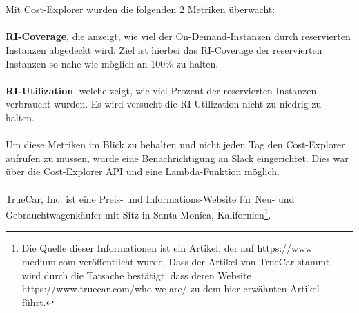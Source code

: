 \\\\
Mit Cost-Explorer wurden die folgenden 2  Metriken überwacht: 
\\\\
\textbf{RI-Coverage}, die anzeigt, wie viel der On-Demand-Instanzen durch reservierten Instanzen abgedeckt wird. Ziel ist hierbei das RI-Coverage der reservierten Instanzen so nahe wie möglich an 100\% zu halten.
\\\\
\textbf{RI-Utilization}, welche zeigt, wie viel Prozent der reservierten Instanzen verbraucht wurden. Es wird versucht die RI-Utilization nicht zu niedrig zu halten.
\\\\
Um diese Metriken im Blick zu behalten und nicht jeden Tag den Cost-Explorer aufrufen zu müssen, wurde eine Benachrichtigung an Slack eingerichtet. Dies war über die Cost-Explorer API und eine Lambda-Funktion möglich.
\\\\
TrueCar, Inc. ist eine Preis- und Informations-Website für Neu- und Gebrauchtwagenkäufer mit Sitz in Santa Monica, Kalifornien\footnote{Die Quelle dieser Informationen ist ein Artikel, der auf https://www medium.com veröffentlicht wurde. Dass der Artikel von TrueCar stammt, wird durch die Tatsache bestätigt, dass deren Website https://www.truecar.com/who-we-are/ zu dem hier erwähnten Artikel führt.}.

